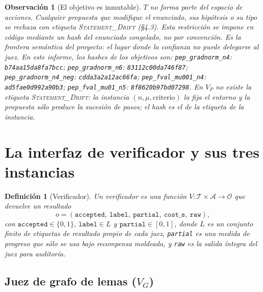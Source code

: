 \documentclass[11pt,a4paper]{article}
\newtheorem{definition}{Definición}
\newtheorem{remark}{Observación}
\begin{document}
\begin{remark}[El objetivo es inmutable]
$T$ no forma parte del espacio de acciones. Cualquier propuesta que modifique el enunciado, sus hipótesis o su tipo se rechaza con etiqueta \textsc{Statement\_Drift} (§4.3). Esta restricción se impone en código mediante un hash del enunciado congelado, no por convención. Es la \emph{frontera semántica} del proyecto: el lugar donde la confianza no puede delegarse al juez.
\sloppy En este informe, los hashes de los objetivos son: \texttt{pep\_\allowbreak{}gradnorm\_\allowbreak{}n4}: \texttt{b74aa15da8fa7bcc}; \texttt{pep\_\allowbreak{}gradnorm\_\allowbreak{}n6}: \texttt{83112c00da746f87}; \texttt{pep\_\allowbreak{}gradnorm\_\allowbreak{}n4\_\allowbreak{}neg}: \texttt{cdda3a2a12ac66fa}; \texttt{pep\_\allowbreak{}fval\_\allowbreak{}mu001\_\allowbreak{}n4}: \texttt{ad5fae0d992a90b3}; \texttt{pep\_\allowbreak{}fval\_\allowbreak{}mu01\_\allowbreak{}n5}: \texttt{8f8620b97bd07298}. En $V_P$ no existe la etiqueta \textsc{Statement\_Drift}: la instancia $(n, \mu, \text{criterio})$ la fija el entorno y la propuesta sólo produce la sucesión de pasos; el hash es el de la etiqueta de la instancia.
\end{remark}

\section{La interfaz de verificador y sus tres instancias}

\begin{definition}[Verificador]
Un verificador es una función $V : \mathcal{T} \times \mathcal{A} \to \mathcal{O}$ que devuelve un \emph{resultado}
\[
  o = (\texttt{accepted},\ \texttt{label},\ \texttt{partial},\ \texttt{cost\_s},\ \texttt{raw}),
\]
con $\texttt{accepted}\in\{0,1\}$, $\texttt{label}\in L$ y $\texttt{partial}\in[0,1]$,
donde $L$ es un conjunto finito de etiquetas de resultado propio de cada juez, \texttt{partial} es una medida de progreso que sólo se usa bajo recompensa moldeada, y \texttt{raw} es la salida íntegra del juez para auditoría.
\end{definition}

\subsection{Juez de grafo de lemas ($V_G$)}
\end{document}
